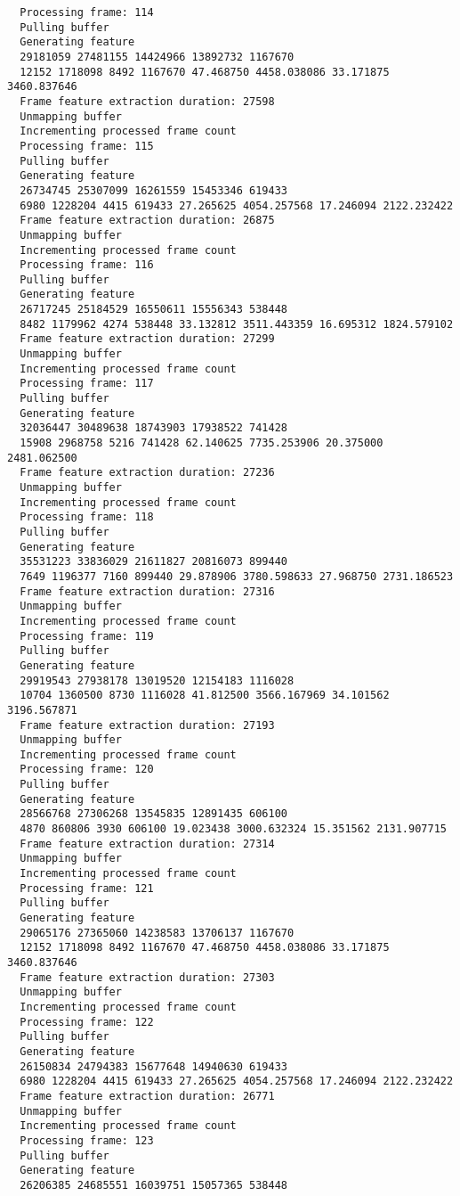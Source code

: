 \documentclass[12pt,oneside]{book}
\begin{document}
\begin{lstlisting}
  Processing frame: 114
  Pulling buffer
  Generating feature
  29181059 27481155 14424966 13892732 1167670
  12152 1718098 8492 1167670 47.468750 4458.038086 33.171875 3460.837646
  Frame feature extraction duration: 27598
  Unmapping buffer
  Incrementing processed frame count
  Processing frame: 115
  Pulling buffer
  Generating feature
  26734745 25307099 16261559 15453346 619433
  6980 1228204 4415 619433 27.265625 4054.257568 17.246094 2122.232422
  Frame feature extraction duration: 26875
  Unmapping buffer
  Incrementing processed frame count
  Processing frame: 116
  Pulling buffer
  Generating feature
  26717245 25184529 16550611 15556343 538448
  8482 1179962 4274 538448 33.132812 3511.443359 16.695312 1824.579102
  Frame feature extraction duration: 27299
  Unmapping buffer
  Incrementing processed frame count
  Processing frame: 117
  Pulling buffer
  Generating feature
  32036447 30489638 18743903 17938522 741428
  15908 2968758 5216 741428 62.140625 7735.253906 20.375000 2481.062500
  Frame feature extraction duration: 27236
  Unmapping buffer
  Incrementing processed frame count
  Processing frame: 118
  Pulling buffer
  Generating feature
  35531223 33836029 21611827 20816073 899440
  7649 1196377 7160 899440 29.878906 3780.598633 27.968750 2731.186523
  Frame feature extraction duration: 27316
  Unmapping buffer
  Incrementing processed frame count
  Processing frame: 119
  Pulling buffer
  Generating feature
  29919543 27938178 13019520 12154183 1116028
  10704 1360500 8730 1116028 41.812500 3566.167969 34.101562 3196.567871
  Frame feature extraction duration: 27193
  Unmapping buffer
  Incrementing processed frame count
  Processing frame: 120
  Pulling buffer
  Generating feature
  28566768 27306268 13545835 12891435 606100
  4870 860806 3930 606100 19.023438 3000.632324 15.351562 2131.907715
  Frame feature extraction duration: 27314
  Unmapping buffer
  Incrementing processed frame count
  Processing frame: 121
  Pulling buffer
  Generating feature
  29065176 27365060 14238583 13706137 1167670
  12152 1718098 8492 1167670 47.468750 4458.038086 33.171875 3460.837646
  Frame feature extraction duration: 27303
  Unmapping buffer
  Incrementing processed frame count
  Processing frame: 122
  Pulling buffer
  Generating feature
  26150834 24794383 15677648 14940630 619433
  6980 1228204 4415 619433 27.265625 4054.257568 17.246094 2122.232422
  Frame feature extraction duration: 26771
  Unmapping buffer
  Incrementing processed frame count
  Processing frame: 123
  Pulling buffer
  Generating feature
  26206385 24685551 16039751 15057365 538448

\end{lstlisting}
\end{document}
